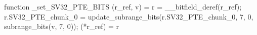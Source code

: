 function _set_SV32_PTE_BITS (r_ref, v) = {
    r = __bitfield_deref(r_ref);
    r.SV32_PTE_chunk_0 = update_subrange_bits(r.SV32_PTE_chunk_0, 7, 0, subrange_bits(v, 7, 0));
    (*r_ref) = r
}
